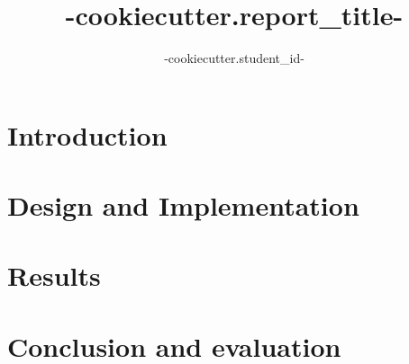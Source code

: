 \documentclass{sty/SizheArticle}
\title{ {{-cookiecutter.report_title-}} }
\author{ {{-cookiecutter.student_id-}} }
\begin{document}
\tableofcontents

\section{Introduction}

\section{Design and Implementation}

\section{Results}

\section{Conclusion and evaluation}

\end{document}
